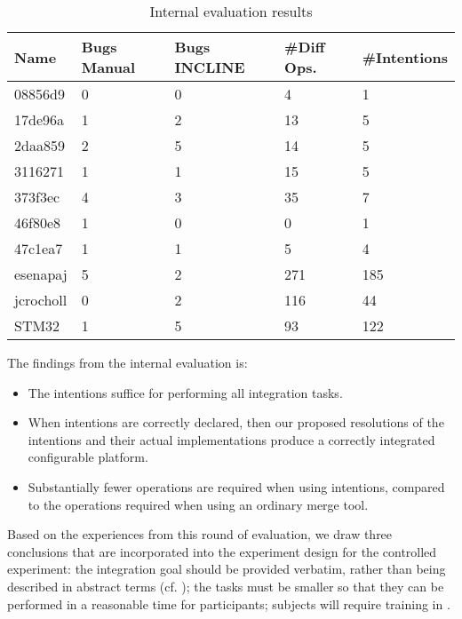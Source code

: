 \begin{table}[h]
    \centering
    \caption{Internal evaluation results}
    \label{tab:internalres}
    \begin{tabular}{l|llll}
\hline\hline
\textbf{Name} & \textbf{Bugs Manual} & \textbf{Bugs INCLINE} & \textbf{\#Diff Ops.} & \textbf{\#Intentions}\\
\hline
08856d9      & 0     & 0     & 4     & 1     \\
17de96a      & 1     & 2     & 13    & 5     \\
2daa859      & 2     & 5     & 14    & 5     \\
3116271      & 1     & 1     & 15    & 5     \\
373f3ec      & 4     & 3     & 35    & 7     \\
46f80e8      & 1     & 0     & 0     & 1     \\
47c1ea7      & 1     & 1     & 5     & 4     \\
\hline
esenapaj     & 5     & 2     & 271   & 185   \\ %
jcrocholl    & 0     & 2     & 116   & 44    \\
STM32   & 1     & 5     & 93    & 122   \\ %
\hline\hline
    \end{tabular}
\end{table}

The findings from the internal evaluation is:

\begin{itemize}
    \item The intentions suffice for performing all integration tasks.
    \item When intentions are correctly declared, then our proposed resolutions of the intentions and their actual implementations produce a correctly integrated configurable platform.
    \item Substantially fewer operations are required when using intentions, compared to the operations required when using an ordinary merge tool.
\end{itemize}

Based on the experiences from this round of evaluation, we draw three conclusions that are incorporated into the experiment design for the controlled experiment: the integration goal should be provided verbatim, rather than being described in abstract terms (cf. \cite{berger2016mps}); the tasks must be smaller so that they can be performed in a reasonable time for participants; subjects will require training in \tooln.


